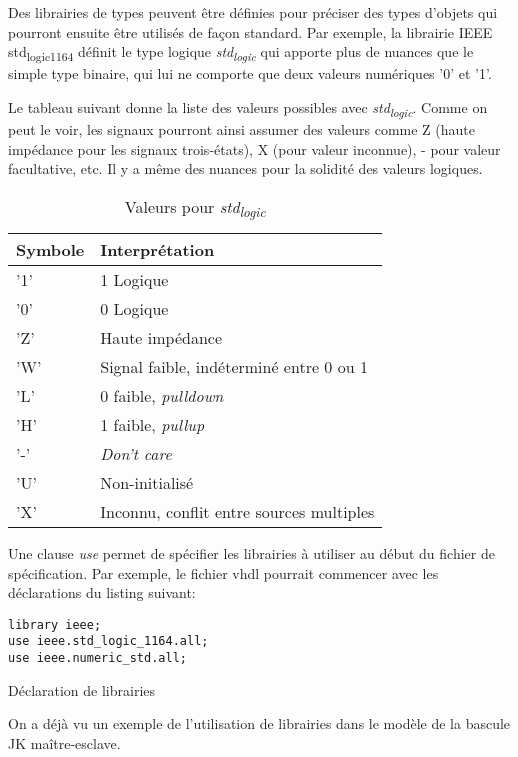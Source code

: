 \documentclass[11pt]{article}
\begin{document}
Des librairies de types peuvent être définies pour préciser des types
d'objets qui pourront ensuite être utilisés de façon standard. Par
exemple, la librairie IEEE std\textsubscript{logic}\textsubscript{1164} définit le type logique
\emph{std\textsubscript{logic}} qui apporte plus de nuances que le simple type binaire,
qui lui ne comporte que deux valeurs numériques '0' et '1'.

Le tableau suivant donne la liste des valeurs possibles avec
\emph{std\textsubscript{logic}}. Comme on peut le voir, les signaux pourront ainsi assumer
des valeurs comme Z (haute impédance pour les signaux trois-états), X
(pour valeur inconnue), - pour valeur facultative, etc. Il y a même
des nuances pour la solidité des valeurs logiques.

\begin{table}[htbp]
\caption{\label{tab:org39b2eb5}Valeurs pour \emph{std\textsubscript{logic}}}
\centering
\begin{tabular}{ll}
Symbole & Interprétation\\
\hline
'1' & 1 Logique\\
'0’ & 0 Logique\\
'Z' & Haute impédance\\
'W' & Signal faible, indéterminé entre 0 ou 1\\
'L' & 0 faible, \emph{pulldown}\\
'H' & 1 faible, \emph{pullup}\\
'-' & \emph{Don't care}\\
'U' & Non-initialisé\\
'X' & Inconnu, conflit entre sources multiples\\
\end{tabular}
\end{table}

Une clause \emph{use} permet de spécifier les librairies à utiliser au
début du fichier de spécification. Par exemple, le fichier vhdl
pourrait commencer avec les déclarations du listing suivant:

\begin{listing}[htbp]
\begin{verbatim}
library ieee;
use ieee.std_logic_1164.all;
use ieee.numeric_std.all;
\end{verbatim}
\caption{Déclaration de librairies}
\end{listing}

On a déjà vu un exemple de l'utilisation de librairies dans le modèle
de la bascule JK maître-esclave.
\end{document}
